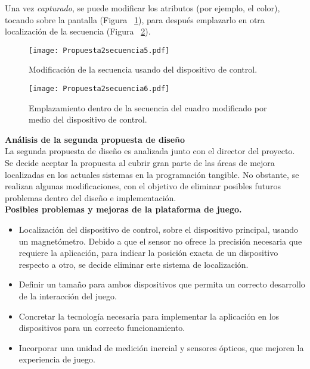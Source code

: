 Una vez \emph{capturado}, se puede modificar los atributos (por ejemplo, el color), tocando sobre la pantalla (Figura ~\ref{fig:Secuencia5}), para después emplazarlo en otra localización de la secuencia (Figura ~\ref{fig:Secuencia6}).

\begin{figure}[!h]
\begin{center}
\texttt{[image: Propuesta2secuencia5.pdf]}
\caption{Modificación de la secuencia usando del dispositivo de control.}
\label{fig:Secuencia5}
\end{center}
\end{figure}

\begin{figure}[!h]
\begin{center}
\texttt{[image: Propuesta2secuencia6.pdf]}
\caption{Emplazamiento dentro de la secuencia del cuadro modificado por medio del dispositivo de control.}
\label{fig:Secuencia6}
\end{center}
\end{figure}

\textbf{Análisis de la segunda propuesta de diseño}\\
La segunda propuesta de diseño es analizada junto con el director del proyecto. Se decide aceptar la propuesta al cubrir gran parte de las áreas de mejora localizadas en los actuales sistemas en la programación tangible. No obstante, se realizan algunas modificaciones, con el objetivo de eliminar posibles futuros problemas dentro del diseño e implementación.\\

\textbf{Posibles problemas y mejoras de la plataforma de juego.}\\
\begin{itemize}
\item Localización del dispositivo de control, sobre el dispositivo principal, usando un
magnetómetro. Debido a que el sensor no ofrece la precisión necesaria que requiere
la aplicación, para indicar la posición exacta de un dispositivo respecto a otro, se
decide eliminar este sistema de localización.
\item Definir un tamaño para ambos dispositivos que permita un correcto desarrollo de la interacción del juego.
\item Concretar la tecnología necesaria para implementar la aplicación en los dispositivos para un correcto funcionamiento.
\item Incorporar una unidad de medición inercial y sensores ópticos, que mejoren la experiencia de juego.
\end{itemize}


